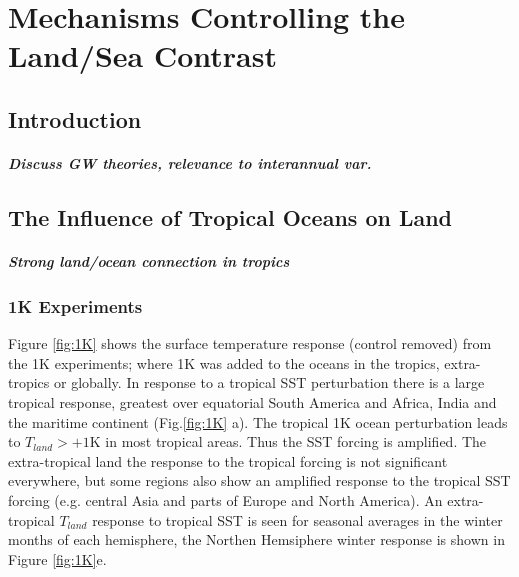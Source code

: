\chapter{Mechanisms Controlling the Land/Sea Contrast} 


\label{mechanisms} 


\section{Introduction}
\paragraph{Discuss GW theories, relevance to interannual var.}


\section{The Influence of Tropical Oceans on Land}

\paragraph{Strong land/ocean connection in tropics}

\subsection{1K Experiments}

Figure \ref{fig:1K} shows the surface temperature response (control removed) 
from the 1K experiments; where 1K was added to the oceans in the tropics, 
extra-tropics or globally. In response to a tropical SST perturbation there is a 
large tropical response, greatest over equatorial South America and Africa, 
India and the maritime continent (Fig.\ref{fig:1K} a). The tropical 1K ocean 
perturbation leads to $T_{land}>+1$K in most tropical areas. Thus the SST 
forcing is amplified. The extra-tropical land the response to the tropical 
forcing is not significant everywhere, but some regions also show an amplified 
response to the tropical SST forcing (e.g. central Asia and parts of Europe and 
North America).  An extra-tropical $T_{land}$ response to tropical SST is seen 
for seasonal averages in the winter months of each hemisphere, the Northen 
Hemsiphere winter response is shown in Figure \ref{fig:1K}e.

